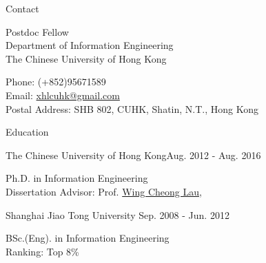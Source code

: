 \documentclass{resume} %
\providecommand*\email[1]{\href{mailto:#1}{#1}}
\begin{document}
\vspace{-3em}

\begin{rSection}{Contact}
\begin{minipage}[t]{0.495\textwidth}
  Postdoc Fellow\\
  Department of Information Engineering \\
  The Chinese University of Hong Kong
  
\end{minipage}
\begin{minipage}[t]{0.495\textwidth}
  Phone: (+852)95671589 \\
  Email: \email{xhlcuhk@gmail.com} \\
  Postal Address: SHB 802, CUHK, Shatin, N.T., Hong Kong 
\end{minipage}
\end{rSection}



\begin{rSection}{Education}
\begin{rSubsection}{The Chinese University of Hong Kong}{Aug. 2012 - Aug. 2016 } {}{}
\item[] Ph.D. in Information Engineering \\
Dissertation Advisor: Prof. \href{http://personal.ie.cuhk.edu.hk/~wclau/}
                   {Wing Cheong Lau}, 
\end{rSubsection} 

\begin{rSubsection}{Shanghai Jiao Tong University} {Sep. 2008 - Jun. 2012}{}{}
\item[]  
BSc.(Eng). in Information Engineering \\
Ranking: Top 8\%
\end{rSubsection}

\end{rSection}
\end{document}
